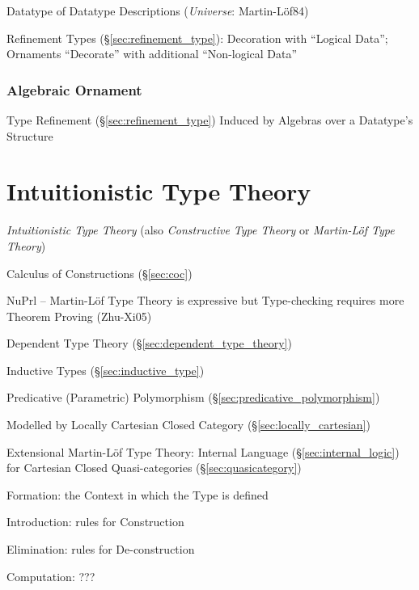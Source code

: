 Datatype of Datatype Descriptions (\emph{Universe}: Martin-L\"of84)

Refinement Types (\S\ref{sec:refinement_type}): Decoration with
``Logical Data''; Ornaments ``Decorate'' with additional ``Non-logical
Data'' %



\subsubsection{Algebraic Ornament}\label{sec:algebraic_ornament}

Type Refinement (\S\ref{sec:refinement_type}) Induced by Algebras over
a Datatype's Structure



\section{Intuitionistic Type Theory}\label{sec:intuitionistic_type}

\cite{martinlof84}

\emph{Intuitionistic Type Theory} (also \emph{Constructive Type
  Theory} or \emph{Martin-L\"of Type Theory})

Calculus of Constructions (\S\ref{sec:coc})

NuPrl -- Martin-L\"of Type Theory is expressive but Type-checking
requires more Theorem Proving (Zhu-Xi05) %

Dependent Type Theory (\S\ref{sec:dependent_type_theory})

Inductive Types (\S\ref{sec:inductive_type})

Predicative (Parametric) Polymorphism
(\S\ref{sec:predicative_polymorphism})

Modelled by Locally Cartesian Closed Category
(\S\ref{sec:locally_cartesian})

Extensional Martin-L\"of Type Theory: Internal Language
(\S\ref{sec:internal_logic}) for Cartesian Closed Quasi-categories
(\S\ref{sec:quasicategory})

Formation: the Context in which the Type is defined

Introduction: rules for Construction

Elimination: rules for De-construction

Computation: ???

